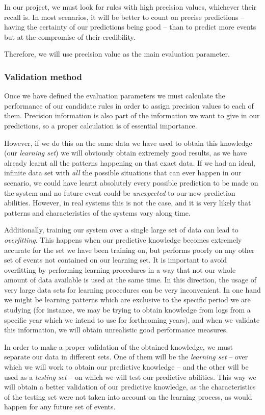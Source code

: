 \documentclass[a4paper,12pt]{article}
\begin{document}
In our project, we must look for rules with high precision values, whichever their recall is. In most scenarios, it will be better to count on precise predictions -- having the certainty of our predictions being good -- than to predict more events but at the compromise of their credibility.

Therefore, we will use precision value as the main evaluation parameter.

\subsubsection{Validation method}
Once we have defined the evaluation parameters we must calculate the performance of our candidate rules in order to assign precision values to each of them. Precision information is also part of the information we want to give in our predictions, so a proper calculation is of essential importance.

However, if we do this on the same data we have used to obtain this knowledge (our \emph{learning set}) we will obviously obtain extremely good results, as we have already learnt all the patterns happening on that exact data. If we had an ideal, infinite data set with \emph{all} the possible situations that can ever happen in our scenario, we could have learnt absolutely every possible prediction to be made on the system and no future event could be \emph{unexpected} to our new prediction abilities. However, in real systems this is not the case, and it is very likely that patterns and characteristics of the systems vary along time. 

Additionally, training our system over a single large set of data can lead to \emph{overfitting}. This happens when our predictive knowledge becomes extremely accurate for the set we have been training on, but performs poorly on any other set of events not contained on our learning set. It is important to avoid overfitting by performing learning procedures in a way that not our whole amount of data available is used at the same time. In this direction, the usage of very large data sets for learning procedures can be very inconvenient. In one hand we might be learning patterns which are exclusive to the specific period we are studying (for instance, we may be trying to obtain knowledge from logs from a specific year which we intend to use for forthcoming years), and when we validate this information, we will obtain unrealistic good performance measures.

In order to make a proper validation of the obtained knowledge, we must separate our data in different sets. One of them will be the \emph{learning set} -- over which we will work to obtain our predictive knowledge -- and the other will be used as a \emph{testing set} -- on which we will test our predictive abilities. This way we will obtain a better validation of our predictive knowledge, as the characteristics of the testing set were not taken into account on the learning process, as  would happen for any future set of events.
\end{document}

